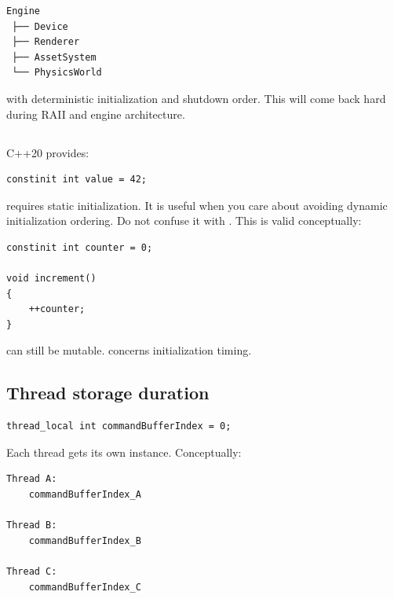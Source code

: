 \begin{verbatim}
Engine
 ├── Device
 ├── Renderer
 ├── AssetSystem
 └── PhysicsWorld
\end{verbatim}

with deterministic initialization and shutdown order. This will come back hard during RAII and engine architecture.

\subsection{\texorpdfstring{}{}}\label{05-engine-i-ch002-constinit}

\hypertarget{05-engine-i-ch002-constinit}{}

C++20 provides:

\begin{verbatim}
constinit int value = 42;
\end{verbatim}

 requires static initialization. It is useful when you care about avoiding dynamic initialization ordering. Do not confuse it with . This is valid conceptually:

\begin{verbatim}
constinit int counter = 0;

void increment()
{
    ++counter;
}
\end{verbatim}

 can still be mutable.  concerns initialization timing.

\subsection{Thread storage duration}\label{05-engine-i-ch002-thread-storage-duration}

\hypertarget{05-engine-i-ch002-thread-storage-duration}{}

\begin{verbatim}
thread_local int commandBufferIndex = 0;
\end{verbatim}

Each thread gets its own instance. Conceptually:

\begin{verbatim}
Thread A:
    commandBufferIndex_A

Thread B:
    commandBufferIndex_B

Thread C:
    commandBufferIndex_C
\end{verbatim}

